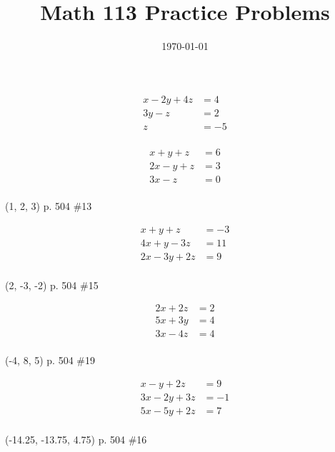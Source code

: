 \documentclass[fleqn,addpoints]{exam}
\title{Math 113 Practice Problems}
\author{}
\date{\today}
\begin{document}
\maketitle

\begin{questions}

\question 
\begin{align*}
  x - 2y + 4z &= 4 \\
      3y -  z &= 2 \\
            z &= -5 \\
\end{align*}
\vspace{1 cm}

\question 
\begin{align*}
   x +  y +  z &= 6 \\
  2x -  y + z &= 3 \\
  3x - z &= 0 \\
\end{align*}
\begin{solution}[3 cm]
  (1, 2, 3)
  p. 504 \#13
\end{solution}

\question 
\begin{align*}
   x +  y +  z &= -3 \\
  4x +  y - 3z &= 11 \\
  2x - 3y + 2z &= 9 \\
\end{align*}
\begin{solution}[3 cm]
  (2, -3, -2)
  p. 504 \#15
\end{solution}

\question 
\begin{align*}
  2x      + 2z &= 2 \\
  5x + 3y      &= 4 \\
  3x      - 4z &= 4 \\
\end{align*}
\begin{solution}[5 cm]
  (-4, 8, 5)
  p. 504 \#19
\end{solution}

\question 
\begin{align*}
   x -  y + 2z &= 9 \\
  3x - 2y + 3z &= -1 \\
  5x - 5y + 2z &= 7 \\
\end{align*}
\begin{solution}[5 cm]
  (-14.25, -13.75, 4.75)
  p. 504 \#16
\end{solution}

\end{questions}
\end{document}
